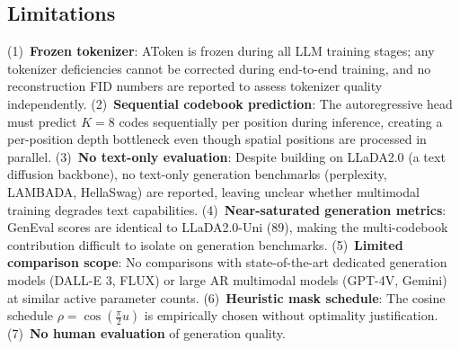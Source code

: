 \documentclass[11pt,a4paper]{article}
\begin{document}
\subsection{Limitations}
(1)~\textbf{Frozen tokenizer}: AToken is frozen during all LLM training stages; any tokenizer deficiencies cannot be corrected during end-to-end training, and no reconstruction FID numbers are reported to assess tokenizer quality independently. (2)~\textbf{Sequential codebook prediction}: The autoregressive head must predict $K{=}8$ codes sequentially per position during inference, creating a per-position depth bottleneck even though spatial positions are processed in parallel. (3)~\textbf{No text-only evaluation}: Despite building on LLaDA2.0 (a text diffusion backbone), no text-only generation benchmarks (perplexity, LAMBADA, HellaSwag) are reported, leaving unclear whether multimodal training degrades text capabilities. (4)~\textbf{Near-saturated generation metrics}: GenEval scores are identical to LLaDA2.0-Uni (89), making the multi-codebook contribution difficult to isolate on generation benchmarks. (5)~\textbf{Limited comparison scope}: No comparisons with state-of-the-art dedicated generation models (DALL-E 3, FLUX) or large AR multimodal models (GPT-4V, Gemini) at similar active parameter counts. (6)~\textbf{Heuristic mask schedule}: The cosine schedule $\rho = \cos(\frac{\pi}{2}u)$ is empirically chosen without optimality justification. (7)~\textbf{No human evaluation} of generation quality.
\end{document}
